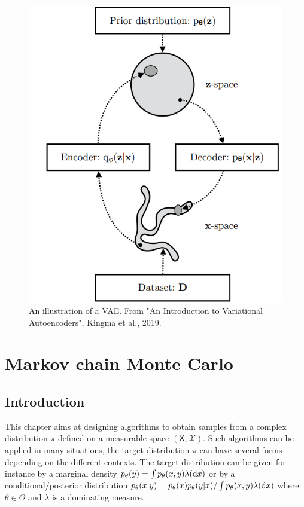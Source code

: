 \documentclass[english,graybox,envcountchap,envcountsame,sectrefs,shortlabels]{svmono}
\theoremstyle{style}
\begin{document}
\begin{figure}
\centering
\includegraphics[scale=0.9]{vae.png}
\caption{An illustration of a VAE. From "An Introduction to Variational Autoencoders", Kingma et al., 2019.}
\label{fig:vae}
\end{figure}

\chapter{Markov chain Monte Carlo}

\section{Introduction}
This chapter aims at designing algorithms to obtain samples from a complex distribution $\pi$ defined on a measurable space $(\mathsf{X},\mathcal{X})$. Such algorithms can be applied in many situations, the target distribution $\pi$ can have several forms depending on the different contexts. The target distribution can be given for instance by a marginal density $p_\theta(y) = \int p_\theta(x,y) \lambda(\mathrm{d} x)$ or by a conditional/posterior distribution $p_\theta(x|y) = p_\theta(x)p_\theta(y|x)/\int p_\theta(x,y) \lambda(\mathrm{d} x)$ where $\theta\in\Theta$ and $\lambda$ is a dominating measure.
\end{document}

